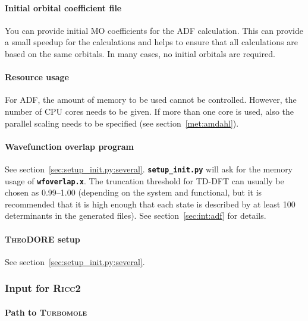 \documentclass[a4paper,10pt,DIV=15,openany]{scrbook}
\newcommand{\ttt}[1]{\textbf{\texttt{#1}}}
\begin{document}
\paragraph{Initial orbital coefficient file}

You can provide initial MO coefficients for the \textsc{ADF} calculation. This can provide a small speedup for the calculations and helps to ensure that all calculations are based on the same orbitals.
In many cases, no initial orbitals are required.

\paragraph{Resource usage}

For \textsc{ADF}, the amount of memory to be used cannot be controlled. However, the number of CPU cores needs to be given. If more than one core is used, also the parallel scaling needs to be specified (see section~\ref{met:amdahl}).

\paragraph{Wavefunction overlap program}

See section~\ref{sec:setup_init.py:several}. \ttt{setup\_init.py} will ask for the memory usage of \ttt{wfoverlap.x}. The truncation threshold for TD-DFT can usually be chosen as 0.99--1.00 (depending on the system and functional, but it is recommended that it is high enough that each state is described by at least 100 determinants in the generated files). See section~\ref{sec:int:adf} for details.

\paragraph{\textsc{TheoDORE} setup}

See section~\ref{sec:setup_init.py:several}. 


\subsubsection{Input for \textsc{Ricc2}}\label{sec:setup_init.py:ricc2}

\paragraph{Path to \textsc{Turbomole}}
\end{document}

